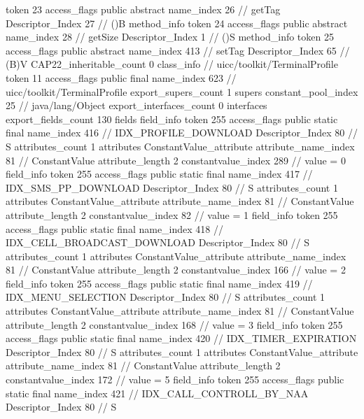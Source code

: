 {{{{{					token	23
					access_flags	public abstract
					name_index	26		// getTag
					Descriptor_Index	27		// ()B
				}
				method_info {
					token	24
					access_flags	public abstract
					name_index	28		// getSize
					Descriptor_Index	1		// ()S
				}
				method_info {
					token	25
					access_flags	public abstract
					name_index	413		// setTag
					Descriptor_Index	65		// (B)V
				}
			}
			CAP22_inheritable_count	0
		}
		class_info {		// uicc/toolkit/TerminalProfile
			token	11
			access_flags	public final
			name_index	623		// uicc/toolkit/TerminalProfile
			export_supers_count	1
			supers {
				constant_pool_index	25		// java/lang/Object
			}
			export_interfaces_count	0
			interfaces {
			}
			export_fields_count	130
			fields {
			field_info {
				token	255
				access_flags	public static final
				name_index	416		// IDX_PROFILE_DOWNLOAD
				Descriptor_Index	80		// S
				attributes_count	1
				attributes {
				ConstantValue_attribute {
					attribute_name_index	81		// ConstantValue
					attribute_length	2
					constantvalue_index	289		// value = 0
				}
				}
			}
			field_info {
				token	255
				access_flags	public static final
				name_index	417		// IDX_SMS_PP_DOWNLOAD
				Descriptor_Index	80		// S
				attributes_count	1
				attributes {
				ConstantValue_attribute {
					attribute_name_index	81		// ConstantValue
					attribute_length	2
					constantvalue_index	82		// value = 1
				}
				}
			}
			field_info {
				token	255
				access_flags	public static final
				name_index	418		// IDX_CELL_BROADCAST_DOWNLOAD
				Descriptor_Index	80		// S
				attributes_count	1
				attributes {
				ConstantValue_attribute {
					attribute_name_index	81		// ConstantValue
					attribute_length	2
					constantvalue_index	166		// value = 2
				}
				}
			}
			field_info {
				token	255
				access_flags	public static final
				name_index	419		// IDX_MENU_SELECTION
				Descriptor_Index	80		// S
				attributes_count	1
				attributes {
				ConstantValue_attribute {
					attribute_name_index	81		// ConstantValue
					attribute_length	2
					constantvalue_index	168		// value = 3
				}
				}
			}
			field_info {
				token	255
				access_flags	public static final
				name_index	420		// IDX_TIMER_EXPIRATION
				Descriptor_Index	80		// S
				attributes_count	1
				attributes {
				ConstantValue_attribute {
					attribute_name_index	81		// ConstantValue
					attribute_length	2
					constantvalue_index	172		// value = 5
				}
				}
			}
			field_info {
				token	255
				access_flags	public static final
				name_index	421		// IDX_CALL_CONTROLL_BY_NAA
				Descriptor_Index	80		// S
}}}}}
